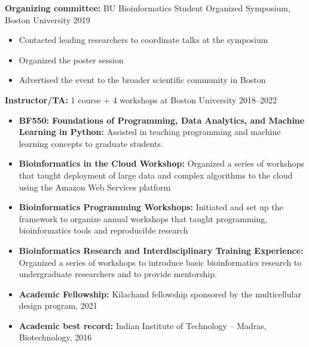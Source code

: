 \documentclass[10pt]{developercv} %
\begin{document}
\begin{minipage}[t]{\textwidth}
  \textbf{Organizing committee:} BU Bioinformatics Student Organized Symposium, Boston University \hfill 2019
  \vspace{-1mm}
  \begin{itemize}[itemsep=-4pt]
    \item Contacted leading researchers to coordinate talks at the symposium
    \item Organized the poster session
    \item Advertised the event to the broader scientific community in Boston
  \end{itemize}
  \textbf{Instructor/TA:} 1 course + 4 workshops at Boston University \hfill 2018--2022
  \vspace{-1mm}
  \begin{itemize}[itemsep=-4pt]
    \item \textbf{BF550: Foundations of Programming, Data Analytics, and Machine Learning in Python:} Assisted in teaching programming and machine learning concepts to graduate students.
    \item \textbf{Bioinformatics in the Cloud Workshop:} Organized a series of workshops that taught deployment of large data and complex algorithms to the cloud using the Amazon Web Services platform
    \item \textbf{Bioinformatics Programming Workshops:} Initiated and set up the framework to organize annual workshops that taught programming, bioinformatics tools and reproducible research
    \item \textbf{Bioinformatics Research and Interdisciplinary Training Experience:} Organized a series of workshops to introduce basic bioinformatics research to undergraduate researchers and to provide mentorship.
  \end{itemize}
\end{minipage}


\vspace{-4mm}

\begin{minipage}[t]{\textwidth}
	\vspace{-3mm}
	\begin{itemize}[itemsep=-4pt]
      \item \textbf{Academic Fellowship:} Kilachand fellowship sponsored by the multicellular design program, 2021
      \item \textbf{Academic best record:} Indian Institute of Technology -- Madras, Biotechnology, 2016
	\end{itemize}
\end{minipage}
\end{document}

